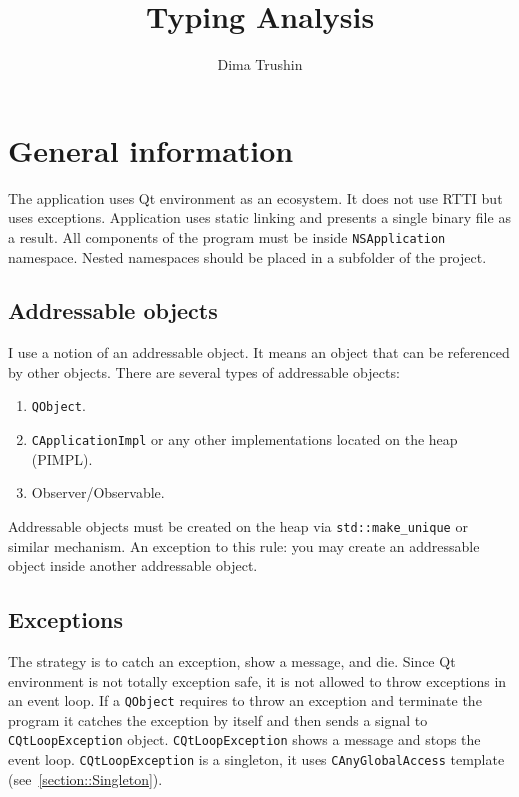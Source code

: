 \documentclass{article}
\begin{document}
\title{Typing Analysis}
\author{Dima Trushin}
\date{}
	
\maketitle
\tableofcontents

\newpage

\section{General information}

The application uses Qt environment as an ecosystem. It does not use RTTI but uses exceptions. Application uses static linking and presents a single binary file as a result. All components of the program must be inside \verb"NSApplication" namespace. Nested namespaces should be placed in a subfolder of the project.

\subsection{Addressable objects}

I use a notion of an addressable object. It means an object that can be referenced by other objects. There are several types of addressable objects:
\begin{enumerate}
\item \verb"QObject".
\item \verb"CApplicationImpl" or any other implementations located on the heap (PIMPL).
\item Observer/Observable.
\end{enumerate}
Addressable objects must be created on the heap via \verb"std::make_unique" or similar mechanism. An exception to this rule: you may create an addressable object inside another addressable object.

\subsection{Exceptions}

The strategy is to catch an exception, show a message, and die. Since Qt environment is not totally exception safe, it is not allowed to throw exceptions in an event loop. If a \verb"QObject" requires to throw an exception and terminate the program it catches the exception by itself and then sends a signal to \verb"CQtLoopException" object. \verb"CQtLoopException" shows a message and stops the event loop. \verb"CQtLoopException" is a singleton, it uses \verb"CAnyGlobalAccess" template (see~\ref{section::Singleton}).
\end{document}
